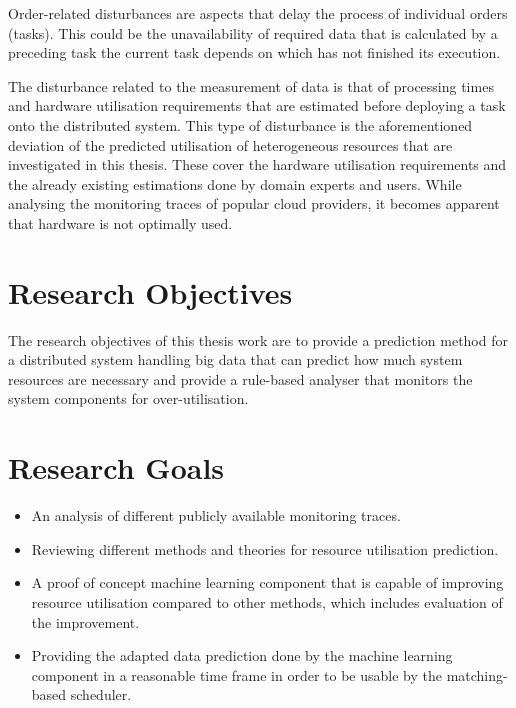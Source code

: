             Order-related disturbances are aspects that delay the process of individual orders (tasks).
            This could be the unavailability of required data that is calculated by a preceding task the current task depends on which has not finished its execution.

            The disturbance related to the measurement of data is that of processing times and hardware utilisation requirements that are estimated before deploying a task onto the distributed system. 
            This type of disturbance is the aforementioned deviation of the predicted utilisation of heterogeneous resources that are investigated in this thesis. These cover the hardware utilisation requirements and the already existing estimations done by domain experts and users. While analysing the monitoring traces of popular cloud providers, it becomes apparent that hardware is not optimally used.


        
        \section{Research Objectives}
        \label{sec:research-objectives-introduction}

            The research objectives of this thesis work are to provide a prediction method for a distributed system handling big data that can predict how much system resources are necessary and provide a rule-based analyser that monitors the system components for over-utilisation.

        \section{Research Goals}
        \label{sec:goals-results-introduction}

            \begin{itemize}
                \item An analysis of different publicly available monitoring traces.
                \item Reviewing different methods and theories for resource utilisation prediction.
                \item A proof of concept machine learning component that is capable of improving resource utilisation compared to other methods, which includes evaluation of the improvement.
                \item Providing the adapted data prediction done by the machine learning component in a reasonable time frame in order to be usable by the matching-based scheduler.
                
            \end{itemize}
            
